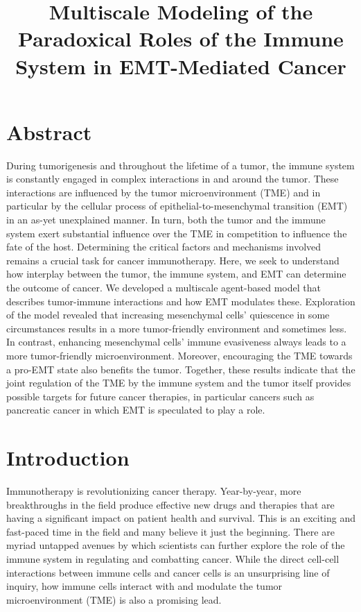 \documentclass{article}
\begin{document}
 \title{Multiscale Modeling of the Paradoxical Roles of the Immune System in EMT-Mediated Cancer}
 \maketitle

\section{Abstract}
During tumorigenesis and throughout the lifetime of a tumor, the immune system is constantly engaged in complex interactions in and around the tumor.
These interactions are influenced by the tumor microenvironment (TME) and in particular by the cellular process of epithelial-to-mesenchymal transition (EMT) in an as-yet unexplained manner.
In turn, both the tumor and the immune system exert substantial influence over the TME in competition to influence the fate of the host.
Determining the critical factors and mechanisms involved remains a crucial task for cancer immunotherapy.
Here, we seek to understand how interplay between the tumor, the immune system, and EMT can determine the outcome of cancer.
We developed a multiscale agent-based model that describes tumor-immune interactions and how EMT modulates these.
Exploration of the model revealed that increasing mesenchymal cells' quiescence in some circumstances results in a more tumor-friendly environment and sometimes less.
In contrast, enhancing mesenchymal cells' immune evasiveness always leads to a more tumor-friendly microenvironment.
Moreover, encouraging the TME towards a pro-EMT state also benefits the tumor.
Together, these results indicate that the joint regulation of the TME by the immune system and the tumor itself provides possible targets for future cancer therapies, in particular cancers such as pancreatic cancer in which EMT is speculated to play a role.


\section{Introduction}
Immunotherapy is revolutionizing cancer therapy.
Year-by-year, more breakthroughs in the field produce effective new drugs and therapies that are having a significant impact on patient health and survival.
This is an exciting and fast-paced time in the field and many believe it just the beginning.
There are myriad untapped avenues by which scientists can further explore the role of the immune system in regulating and combatting cancer.
While the direct cell-cell interactions between immune cells and cancer cells is an unsurprising line of inquiry, how immune cells interact with and modulate the tumor microenvironment (TME) is also a promising lead.
\end{document}
